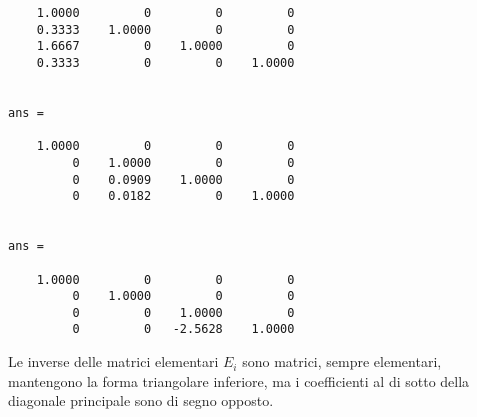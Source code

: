 \begin{enumerate}
\begin{svol}
\begin{codice}
\begin{verbatim}
    1.0000         0         0         0
    0.3333    1.0000         0         0
    1.6667         0    1.0000         0
    0.3333         0         0    1.0000


ans =

    1.0000         0         0         0
         0    1.0000         0         0
         0    0.0909    1.0000         0
         0    0.0182         0    1.0000


ans =

    1.0000         0         0         0
         0    1.0000         0         0
         0         0    1.0000         0
         0         0   -2.5628    1.0000

\end{verbatim}
\end{codice}
Le inverse delle matrici elementari $E_i$ sono matrici, sempre elementari,
mantengono la forma triangolare inferiore, ma i coefficienti al di sotto della
diagonale principale sono di segno opposto. 
\end{svol}

\end{enumerate}
